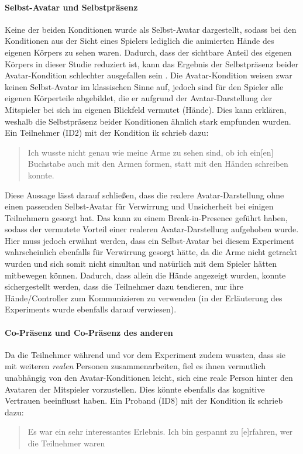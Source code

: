 \documentclass[a4paper,11pt]{article}%
\renewcommand{\\}{\vspace*{0.5\baselineskip} \newline}
\begin{document}
{{\paragraph{Selbst-Avatar und Selbstpräsenz}
Keine der beiden Konditionen wurde als Selbst-Avatar dargestellt, sodass bei den Konditionen aus der Sicht eines Spielers lediglich die animierten Hände des eigenen Körpers zu sehen waren. 
Dadurch, dass der sichtbare Anteil des eigenen Körpers in dieser Studie reduziert ist, kann das Ergebnis der Selbstpräsenz beider Avatar-Kondition schlechter ausgefallen sein \citep[421-427]{construal2014connected}.
Die Avatar-Kondition weisen zwar keinen Selbst-Avatar im klassischen Sinne auf, jedoch sind für den Spieler alle eigenen Körperteile abgebildet, die er aufgrund der Avatar-Darstellung der Mitspieler bei sich im eigenen Blickfeld vermutet (Hände). Dies kann erklären, weshalb die Selbstpräsenz beider Konditionen ähnlich stark empfunden wurden. Ein Teilnehmer (ID2) mit der Kondition \ac{ik} schrieb dazu:
\begin{quote}
\glqq{}Ich wusste nicht genau wie meine Arme zu sehen sind, ob ich ein[en] Buchstabe auch mit den Armen formen, statt mit den Händen schreiben konnte.\dq{}
\end{quote}
Diese Aussage lässt darauf schließen, dass die realere Avatar-Darstellung ohne einen passenden Selbst-Avatar für Verwirrung und Unsicherheit bei einigen Teilnehmern gesorgt hat. Das kann zu einem Break-in-Presence geführt haben, sodass der vermutete Vorteil einer realeren Avatar-Darstellung aufgehoben wurde. Hier muss jedoch erwähnt werden, dass ein Selbst-Avatar bei diesem Experiment wahrscheinlich ebenfalls für Verwirrung gesorgt hätte, da die Arme nicht getrackt wurden und sich somit nicht simultan und natürlich mit dem Spieler hätten mitbewegen können. Dadurch, dass allein die Hände angezeigt wurden, konnte sichergestellt werden, dass die Teilnehmer dazu tendieren, nur ihre Hände/Controller zum Kommunizieren zu verwenden (in der Erläuterung des Experiments wurde ebenfalls darauf verwiesen).

\paragraph{Co-Präsenz und Co-Präsenz des anderen} Da die Teilnehmer während und vor dem Experiment zudem wussten, dass sie mit weiteren \textit{realen} Personen zusammenarbeiten, fiel es ihnen vermutlich unabhängig von den Avatar-Konditionen leicht, sich eine reale Person hinter den Avataren der Mitspieler vorzustellen. Dies könnte ebenfalls das kognitive Vertrauen beeinflusst haben. Ein Proband (ID8) mit der Kondition \ac{ik} schrieb dazu:
\begin{quote}
\glqq{}Es war ein sehr interessantes Erlebnis. Ich bin gespannt zu [e]rfahren, wer die Teilnehmer waren\dq{}
\end{quote}

}}
\end{document}
